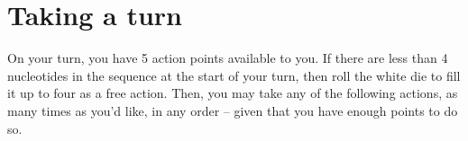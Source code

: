 \documentclass[a4paper,11pt,oneside]{memoir}
\begin{document}
%
%
%
%
%
%    
%
%
%    
%
%
%
%
%
%
%
%
%
%


\section*{Taking a turn}

On your turn, you have 5 action points available to you.
If there are less than 4 nucleotides in the sequence at the start of your turn, then roll the white die to fill it up to four as a free action.
Then, you may take any of the following actions, as many times as you'd like, in any order -- given that you have enough points to do so.
\end{document}
